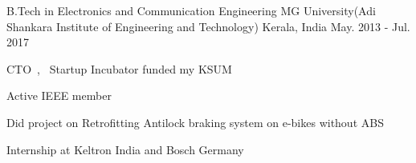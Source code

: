 

\begin{cventries}

  \cventry
    {B.Tech in Electronics and Communication Engineering} %
    {MG University(Adi Shankara Institute of Engineering and Technology)} %
    {Kerala, India} %
    {May. 2013 - Jul. 2017} %
    {
      \begin{cvitems} %
        \item {CTO~,~ Startup Incubator funded my KSUM}
        \item {Active IEEE member}
        \item {Did project on Retrofitting Antilock braking system on e-bikes without ABS} 
        \item {Internship at Keltron India and Bosch Germany}  
    \end{cvitems}
    }

\end{cventries}


